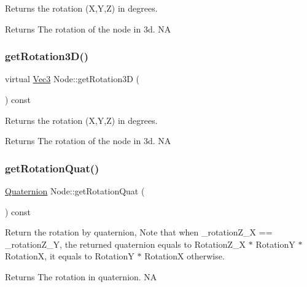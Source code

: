 Returns the rotation (X,Y,Z) in degrees.

\begin{DoxyReturn}{Returns}
The rotation of the node in 3d.  NA 
\end{DoxyReturn}
\mbox{\label{classNode_a9aab6e44008bf374051cc87c76d9079f}} 
\subsubsection{\texorpdfstring{get\+Rotation3\+D()}{getRotation3D()}\hspace{0.1cm}{\footnotesize\ttfamily [2/2]}}
{\footnotesize\ttfamily virtual \hyperlink{classVec3}{Vec3} Node\+::get\+Rotation3D (\begin{DoxyParamCaption}{ }\end{DoxyParamCaption}) const\hspace{0.3cm}{\ttfamily [virtual]}}

Returns the rotation (X,Y,Z) in degrees.

\begin{DoxyReturn}{Returns}
The rotation of the node in 3d.  NA 
\end{DoxyReturn}
\mbox{\label{classNode_ad5beb5903cd9dc3258b513e742d1a0d0}} 
\subsubsection{\texorpdfstring{get\+Rotation\+Quat()}{getRotationQuat()}\hspace{0.1cm}{\footnotesize\ttfamily [1/2]}}
{\footnotesize\ttfamily \hyperlink{classQuaternion}{Quaternion} Node\+::get\+Rotation\+Quat (\begin{DoxyParamCaption}{ }\end{DoxyParamCaption}) const\hspace{0.3cm}{\ttfamily [virtual]}}

Return the rotation by quaternion, Note that when \+\_\+rotation\+Z\+\_\+X == \+\_\+rotation\+Z\+\_\+Y, the returned quaternion equals to Rotation\+Z\+\_\+X $\ast$ RotationY $\ast$ RotationX, it equals to RotationY $\ast$ RotationX otherwise.

\begin{DoxyReturn}{Returns}
The rotation in quaternion.  NA 
\end{DoxyReturn}
\mbox{\label{classNode_a6200a7e63f7ccccabc82a7a4554e7d36}} 
